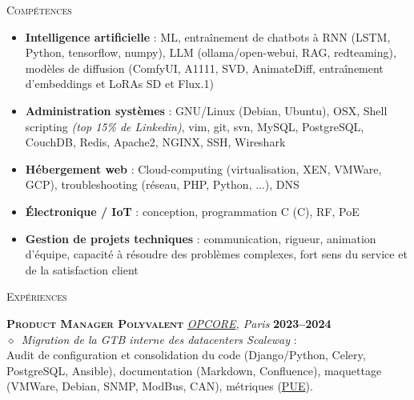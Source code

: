 \documentclass[11pt, a4paper]{article}
\newcommand{\dates}[1]{\hfill\mbox{\textbf{#1}}} %
\newcommand{\smaller}[1]{{\small#1}}
\newcommand{\headright}[1]{\vspace*{2.5ex}\textsc{\Large\color{bandeau}#1}\par%
     \vspace*{-1ex}{\color{bandeau}\hrulefill}\par}
\begin{document}
\begin{minipage}[t]{0.5\textwidth}
\setlength{\parskip}{0.8ex}%

\vspace{0.5ex}				%

\Large
\headright{\BNP Compétences}
\small
\begin{itemize}
\item \textbf{Intelligence artificielle} : ML, entraînement de chatbots à RNN (LSTM, Python, tensorflow, numpy), LLM (ollama/open-webui, RAG, redteaming), modèles de diffusion (ComfyUI, A1111, SVD, \mbox{AnimateDiff}, \mbox{entraînement} d'embeddings et LoRAs SD et Flux.1)
\item \textbf{Administration systèmes} : GNU/Linux (Debian, Ubuntu), OSX, Shell \mbox{scripting} {\scriptsize\textit{(top 15\% de Linkedin)}}, vim, git, svn, MySQL, \mbox{PostgreSQL}, CouchDB, Redis, Apache2, NGINX, SSH, Wireshark
\item \textbf{Hébergement web} : Cloud-computing (virtualisation, XEN, \mbox{VMWare}, GCP), troubleshooting (réseau, PHP, Python, ...), DNS
\item \textbf{Électronique / IoT} : conception, programmation C (\textmu C), RF, PoE
\item \textbf{Gestion de projets techniques} : \mbox{communication}, rigueur, \mbox{animation} d'équipe, capacité à résoudre des problèmes \mbox{complexes}, fort sens du service et de la satisfaction client
\end{itemize} 
\normalsize
\vspace*{-2ex} %


\Large
\headright{\BNP Expériences}
\small
\textbf{\textsc{Product Manager Polyvalent}} \textit{\href{https://www.opcore.com/}{\color{link}OPCORE}, Paris}  \dates{2023--2024} \\
\smaller{$\diamond$\ \textit{Migration de la GTB interne des \mbox{datacenters} Scaleway} : \\
Audit de configuration et \mbox{consolidation} du code (Django/Python, Celery, PostgreSQL, \mbox{Ansible}), \mbox{documentation} (Markdown, \mbox{Confluence}), maquettage (\mbox{VMWare}, Debian, SNMP, \mbox{ModBus}, CAN), métriques (\href{https://pue.dc5.scaleway.com/fr/}{\color{link}PUE}).}


\end{minipage}
\end{document}
